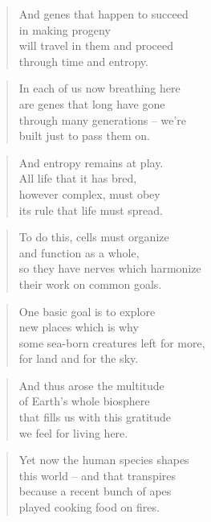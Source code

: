 \documentclass[14pt,a4paper]{article}
\begin{document}
\begin{verse}
And genes that happen to succeed\\
in making progeny\\
will travel in them and proceed\\
through time and entropy.
\end{verse}

\begin{verse}
In each of us now breathing here\\
are genes that long have gone\\
through many generations – we’re\\
built just to pass them on.
\end{verse}

\begin{verse}
And entropy remains at play.\\
All life that it has bred,\\
however complex, must obey\\
its rule that life must spread.
\end{verse}

\begin{verse}
To do this, cells must organize\\
and function as a whole,\\
so they have nerves which harmonize\\
their work on common goals.
\end{verse}

\begin{verse}
One basic goal is to explore\\
new places which is why\\
some sea-born creatures left for more,\\
for land and for the sky.
\end{verse}

\begin{verse}
And thus arose the multitude\\
of Earth’s whole biosphere\\
that fills us with this gratitude\\
we feel for living here.
\end{verse}

\begin{verse}
Yet now the human species shapes\\
this world – and that transpires\\
because a recent bunch of apes\\
played cooking food on fires.
\end{verse}
\end{document}
